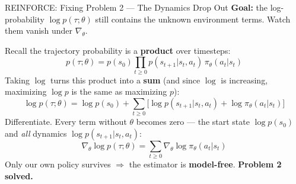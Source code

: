 \begin{frame}{REINFORCE: Fixing Problem 2 --- The Dynamics Drop Out}
\textbf{Goal:} the log-probability $\log p(\tau;\theta)$ still contains the unknown environment terms. Watch them vanish under $\nabla_\theta$.
\vspace{0.2em}

Recall the trajectory probability is a \textbf{product} over timesteps:
$$p(\tau;\theta) = p(s_0) \prod_{t \geq 0} p(s_{t+1}|s_t, a_t)\, \pi_\theta(a_t|s_t)$$
\pause
Taking $\log$ turns this product into a \textbf{sum} (and since $\log$ is increasing, maximizing $\log p$ is the same as maximizing $p$):
$$\log p(\tau;\theta) = \log p(s_0) + \sum_{t \geq 0} \Big[ \log p(s_{t+1}|s_t, a_t) + \log \pi_\theta(a_t|s_t) \Big]$$
\pause
Differentiate. Every term without $\theta$ becomes zero --- the start state $\log p(s_0)$ and \emph{all} dynamics $\log p(s_{t+1}|s_t, a_t)$:
$$\nabla_\theta \log p(\tau;\theta) = \sum_{t \geq 0} \nabla_\theta \log \pi_\theta(a_t|s_t)$$
\pause
Only our own policy survives $\Rightarrow$ the estimator is \textbf{model-free}. \textbf{Problem 2 solved.}
\end{frame}

